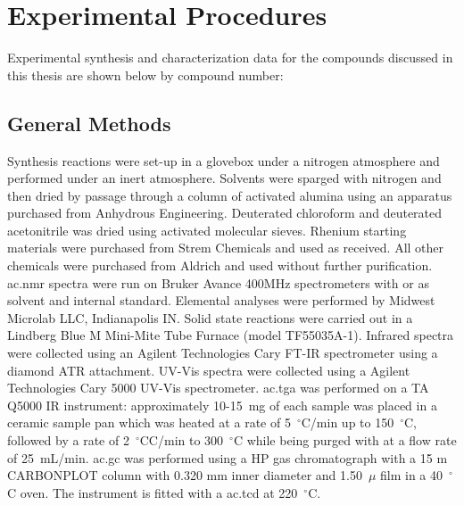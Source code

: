 \chapter{Experimental Procedures}\label{app.exp}

Experimental synthesis and characterization data for the compounds discussed in this thesis are shown below by compound number:

\section{General Methods}\label{sec:.genmethods}
Synthesis reactions were set-up in a glovebox under a nitrogen atmosphere and performed under an inert atmosphere. Solvents were sparged with nitrogen and then dried by passage through a column of activated alumina using an apparatus purchased from Anhydrous Engineering. Deuterated chloroform and deuterated acetonitrile was dried using activated molecular sieves. Rhenium starting materials were purchased from Strem Chemicals and used as received. All other chemicals were purchased from Aldrich and used without further purification. \Gls{ac.nmr} spectra were run on Bruker Avance 400MHz spectrometers with  or  as solvent and internal standard. Elemental analyses were performed by Midwest Microlab LLC, Indianapolis IN. Solid state reactions were carried out in a Lindberg Blue M Mini-Mite Tube Furnace (model TF55035A-1). Infrared spectra were collected using an Agilent Technologies Cary FT-IR spectrometer using a diamond ATR attachment. UV-Vis spectra were collected using a Agilent Technologies Cary 5000 UV-Vis spectrometer. \Gls{ac.tga} was performed on a TA Q5000 IR instrument: approximately 10-15~mg of each sample was placed in a ceramic sample pan which was heated at a rate of 5~$^\circ$C/min up to 150~$^\circ$C, followed by a rate of 2~$^\circ$CC/min to 300~$^\circ$C while being purged with  at a flow rate of 25~mL/min. \Gls{ac.gc} was performed using a HP gas chromatograph with a 15 m CARBONPLOT column with 0.320 mm inner diameter and 1.50~$\mu$ film in a 40~$^\circ$C oven. The instrument is fitted with a \gls{ac.tcd} at 220~$^\circ$C.

